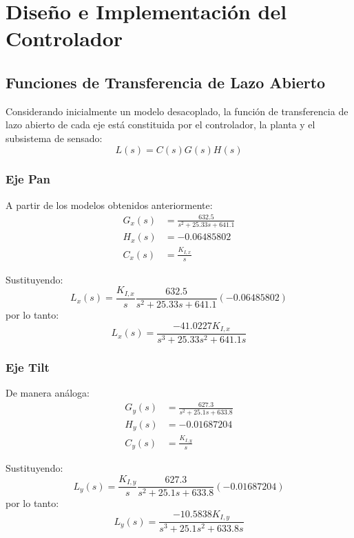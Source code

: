 \documentclass[12pt,a4paper]{article}
\begin{document}
\section{Diseño e Implementación del Controlador}

\subsection{Funciones de Transferencia de Lazo Abierto}
Considerando inicialmente un modelo desacoplado, la función de transferencia de lazo abierto de cada eje está constituida por el controlador, la planta y el subsistema de sensado:
\begin{equation}
\boxed{L(s) = C(s)G(s)H(s)}
\end{equation}

\subsubsection{Eje Pan}
A partir de los modelos obtenidos anteriormente:
\begin{align}
G_x(s) &= \frac{632.5}{s^2 + 25.33s + 641.1} \\
H_x(s) &= -0.06485802 \\
C_x(s) &= \frac{K_{I,x}}{s}
\end{align}

Sustituyendo:
\begin{equation}
L_x(s) = \frac{K_{I,x}}{s}\frac{632.5}{s^2 + 25.33s + 641.1}(-0.06485802)
\end{equation}
por lo tanto:
\begin{equation}
\boxed{L_x(s) = \frac{-41.0227K_{I,x}}{s^3 + 25.33s^2 + 641.1s}}
\end{equation}

\subsubsection{Eje Tilt}
De manera análoga:
\begin{align}
G_y(s) &= \frac{627.3}{s^2 + 25.1s + 633.8} \\
H_y(s) &= -0.01687204 \\
C_y(s) &= \frac{K_{I,y}}{s}
\end{align}

Sustituyendo:
\begin{equation}
L_y(s) = \frac{K_{I,y}}{s}\frac{627.3}{s^2 + 25.1s + 633.8}(-0.01687204)
\end{equation}
por lo tanto:
\begin{equation}
\boxed{L_y(s) = \frac{-10.5838K_{I,y}}{s^3 + 25.1s^2 + 633.8s}}
\end{equation}
\end{document}
